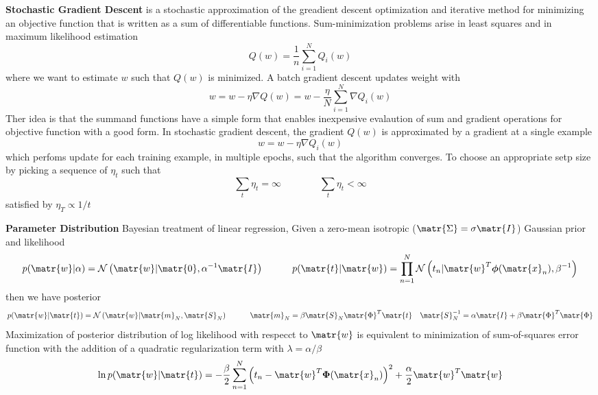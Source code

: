 \documentclass[11pt]{article}
\begin{document}
\begin{defn*}
    \textbf{Stochastic Gradient Descent} is a stochastic approximation of the greadient descent optimization and iterative method for minimizing an objective function that is written as a sum of differentiable functions. Sum-minimization problems arise in least squares and in maximum likelihood estimation 
    \[
        Q(w) = \frac{1}{n} \sum_{i=1}^N Q_i(w)    
    \]
    where we want to estimate $w$ such that $Q(w)$ is minimized. A batch gradient descent updates weight with 
    \[
        w = w - \eta \nabla Q(w) = w - \frac{\eta}{N} \sum_{i=1}^N \nabla Q_i(w)    
    \]
    Ther idea is that the summand functions have a simple form that enables inexpensive evalaution of sum and gradient operations for objective function with a good form. In stochastic gradient descent, the gradient $Q(w)$ is approximated by a gradient at a single example 
    \[
        w = w - \eta \nabla Q_i(w)    
    \]
    which perfoms update for each training example, in multiple epochs, such that the algorithm converges. To choose an appropriate setp size by picking a sequence of $\eta_t$ such that 
    \[
        \sum_t \eta_t = \infty 
        \quad \quad \quad \quad 
        \sum_t \eta_t < \infty    
    \]
    satisfied by $\eta_T \propto 1/t$
\end{defn*}





\begin{defn*}
    \textbf{Parameter Distribution} Bayesian treatment of linear regression, Given a zero-mean isotropic ($\matr{\Sigma}=\sigma\matr{I}$) Gaussian prior and likelihood
    \[
        p(\matr{w}|\alpha) = \normal{\matr{w}| \matr{0}, \alpha^{-1}\matr{I}}
        \quad \quad \quad 
        p(\matr{t}|\matr{w}) = \prod_{n=1}^N \normal{t_n | \matr{w}^T \boldsymbol{\phi}(\matr{x}_n), \beta^{-1}}
    \]
    then we have posterior
    \[
        p(\matr{w}|\matr{t}) = \normal{\matr{w}|\matr{m}_N, \matr{S}_N}
        \quad \quad \quad 
        \matr{m}_N = \beta \matr{S}_N \matr{\Phi}^T \matr{t} 
        \quad 
        \matr{S}_N^{-1} = \alpha\matr{I} + \beta \matr{\Phi}^T\matr{\Phi}
    \]
    Maximization of posterior distribution of log likelihood with respecct to $\matr{w}$ is equivalent to minimization of sum-of-squares error function with the addition of a quadratic regularization term with $\lambda = \alpha/\beta$ 
    \[
        \ln{p(\matr{w}|\matr{t})} = -\frac{\beta}{2} \sum_{n=1}^N \left(t_n - \matr{w}^T \boldsymbol{\Phi}(\matr{x}_n)\right)^2 + \frac{\alpha}{2} \matr{w}^T \matr{w}
    \]
\end{defn*}
\end{document}

